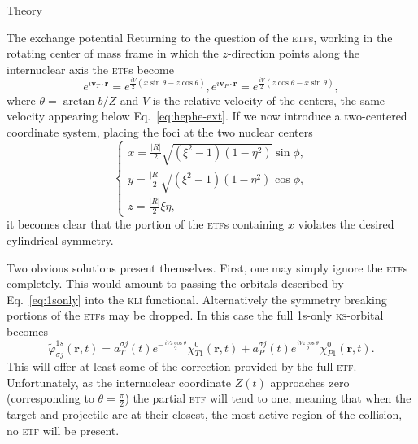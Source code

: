 \documentclass[aps, pra, reprint, groupedaddress, amsfonts, longbibliography,
               amsmath, amssymb, showpacs, nofootinbib]{revtex4-1}
\begin{document}
\begin{section}{Theory \label{sec:theory}}
\begin{subsection}{The exchange potential \label{sec:xpot}}
      Returning to the question of the \textsc{etf}s, working in the rotating center of mass frame in
      which the $z$-direction points along the internuclear axis the \textsc{etf}s become
      \begin{subequations} \label{eq:etf}
         \begin{equation} \label{eq:etfT}
            e^{i \mathbf{v}_T \cdot \mathbf{r}} =
             e^{\frac{i V}{2} (x \sin \theta - z \cos \theta)},
         \end{equation}
         \begin{equation} \label{eq:etfP}
            e^{i \mathbf{v}_P \cdot \mathbf{r}} =
             e^{\frac{i V}{2} (z \cos \theta - x \sin \theta)},
         \end{equation}
      \end{subequations}
      where $\theta = \arctan b/Z$ and $V$ is the relative velocity of the centers, the same velocity
      appearing below Eq.~\eqref{eq:hephe-ext}. If we now introduce a two-centered coordinate system,
      placing the foci at the two nuclear centers
      \begin{equation} \label{eq:psc}
            \left\{
            \begin{array}{l}
               x = \frac{|R|}{2} \sqrt{(\xi^2 - 1)(1 - \eta^2)} \sin \phi, \\ [2ex]
               y = \frac{|R|}{2} \sqrt{(\xi^2 - 1)(1 - \eta^2)} \cos \phi, \\ [2ex]
               z = \frac{|R|}{2} \xi \eta,
            \end{array}
            \right.
      \end{equation}
      it becomes clear that the portion of the \textsc{etf}s containing $x$ violates the desired
      cylindrical symmetry.

      Two obvious solutions present themselves. First, one may simply ignore the \textsc{etf}s
      completely. This would amount to passing the orbitals described by Eq.~\eqref{eq:1sonly} into
      the \textsc{kli} functional. Alternatively the symmetry breaking portions of the \textsc{etf}s
      may be dropped. In this case the full 1s-only \textsc{ks}-orbital becomes
      \begin{equation} \label{eq:1sonlyetf}
         \tilde{\varphi}_{\sigma j}^{1s} (\mathbf{r},t) =
                      a^{\sigma j}_T (t)  e^{-\frac{i V z \cos \theta}{2}} \chi^{0}_{T1} (\mathbf{r},t)
                    + a^{\sigma j}_P (t)  e^{ \frac{i V z \cos \theta}{2}} \chi^{0}_{P1} (\mathbf{r},t).
      \end{equation}
      This will offer at least some of the correction provided by the full \textsc{etf}. Unfortunately,
      as the internuclear coordinate $Z(t)$ approaches zero (corresponding to $\theta = \frac{\pi}{2}$)
      the partial \textsc{etf} will tend to one, meaning that when the target and projectile are at
      their closest, the most active region of the collision, no \textsc{etf} will be present.


\end{subsection}
\end{section}
\end{document}
